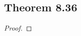 \documentclass[../../main.tex]{subfiles}
\begin{document}
\subsection{Theorem 8.36}
\begin{wts}

\end{wts}
\begin{proof}

\end{proof}
\end{document}
